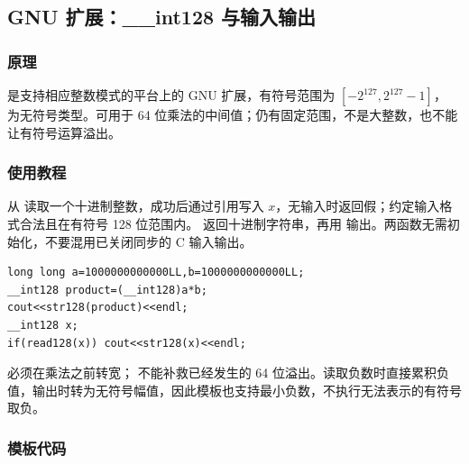 \subsection{GNU 扩展：\_\_int128 与输入输出}
\label{stl:int128}
\subsubsection*{原理}
 是支持相应整数模式的平台上的 GNU 扩展，有符号范围为 $[-2^{127},2^{127}-1]$， 为无符号类型。可用于 64 位乘法的中间值；仍有固定范围，不是大整数，也不能让有符号运算溢出。
\subsubsection*{使用教程}
 从  读取一个十进制整数，成功后通过引用写入 $x$，无输入时返回假；约定输入格式合法且在有符号 128 位范围内。 返回十进制字符串，再用  输出。两函数无需初始化，不要混用已关闭同步的 C 输入输出。
\begin{lstlisting}[style=mtycpp,numbers=none]
long long a=1000000000000LL,b=1000000000000LL;
__int128 product=(__int128)a*b;
cout<<str128(product)<<endl;
__int128 x;
if(read128(x)) cout<<str128(x)<<endl;
\end{lstlisting}
必须在乘法之前转宽； 不能补救已经发生的 64 位溢出。读取负数时直接累积负值，输出时转为无符号幅值，因此模板也支持最小负数，不执行无法表示的有符号取负。
\subsubsection*{模板代码}
